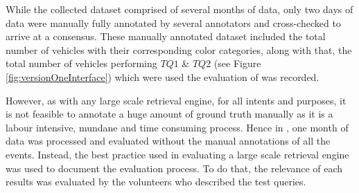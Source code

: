 While the collected dataset comprised of several months of data, only two days of data were manually fully annotated by several annotators and cross-checked to arrive at a consensus. These manually annotated dataset included the total number of vehicles with their corresponding color categories, along with that, the total number of vehicles performing $TQ1$ \& $TQ2$ (see Figure \ref{fig:versionOneInterface}) which were used the evaluation of \versionOne was recorded. 

However, as with any large scale retrieval engine, for all intents and purposes, it is not feasible to annotate a huge amount of ground truth manually as it is a labour intensive, mundane and time consuming process. Hence in \versionTwo, one month of data was processed and evaluated without the manual annotations of all the events. Instead, the best practice used in evaluating a large scale retrieval engine was used to document the evaluation process. To do that, the relevance of each results was evaluated by the volunteers who described the test queries. 

